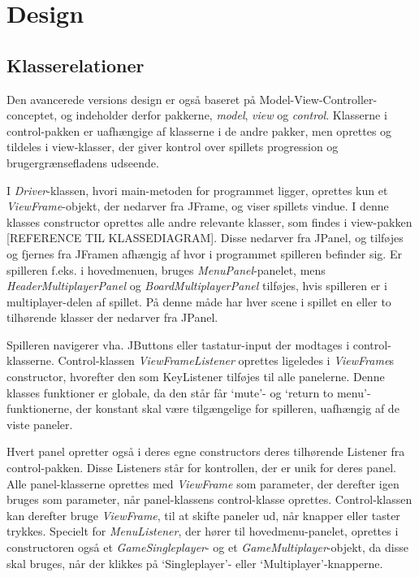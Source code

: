 \section{Design}

\subsection{Klasserelationer}
Den avancerede versions design er også baseret på Model-View-Controller-conceptet, og indeholder derfor pakkerne, \textit{model}, \textit{view} og \textit{control}. Klasserne i control-pakken er uafhængige af klasserne i de andre pakker, men oprettes og tildeles i view-klasser, der giver kontrol over spillets progression og brugergrænsefladens udseende.

I \textit{Driver}-klassen, hvori main-metoden for programmet ligger, oprettes kun et \textit{ViewFrame}-objekt, der nedarver fra JFrame, og viser spillets vindue. I denne klasses constructor oprettes alle andre relevante klasser, som findes i view-pakken [REFERENCE TIL KLASSEDIAGRAM]. Disse nedarver fra JPanel, og tilføjes og fjernes fra JFramen afhængig af hvor i programmet spilleren befinder sig. Er spilleren f.eks. i hovedmenuen, bruges \textit{MenuPanel}-panelet, mens \textit{HeaderMultiplayerPanel} og \textit{BoardMultiplayerPanel} tilføjes, hvis spilleren er i multiplayer-delen af spillet. På denne måde har hver scene i spillet en eller to tilhørende klasser der nedarver fra JPanel. 

Spilleren navigerer vha. JButtons eller tastatur-input der modtages i control-klasserne. Control-klassen \textit{ViewFrameListener} oprettes ligeledes i \textit{ViewFrame}s constructor, hvorefter den som KeyListener tilføjes til alle panelerne. Denne klasses funktioner er globale, da den står får `mute'- og `return to menu'-funktionerne, der konstant skal være tilgængelige for spilleren, uafhængig af de viste paneler.


Hvert panel opretter også i deres egne constructors deres tilhørende Listener fra control-pakken. Disse Listeners står for kontrollen, der er unik for deres panel. Alle panel-klasserne oprettes med \textit{ViewFrame} som parameter, der derefter igen bruges som parameter, når panel-klassens control-klasse oprettes. Control-klassen kan derefter bruge \textit{ViewFrame}, til at skifte paneler ud, når knapper eller taster trykkes. Specielt for \textit{MenuListener}, der hører til hovedmenu-panelet, oprettes i constructoren også et \textit{GameSingleplayer}- og et \textit{GameMultiplayer}-objekt, da disse skal bruges, når der klikkes på `Singleplayer'- eller `Multiplayer'-knapperne. 

